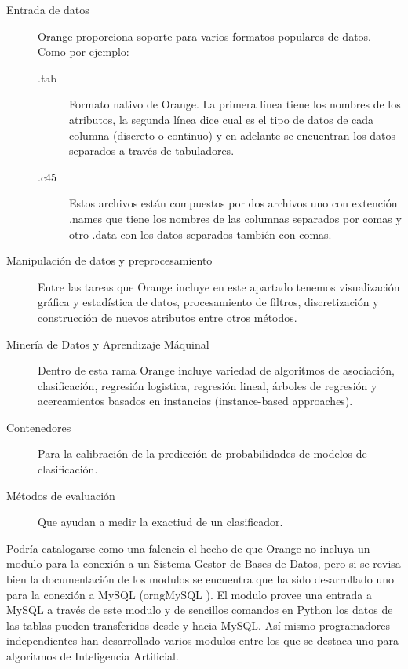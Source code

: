 \begin{description}
\item [Entrada de datos] Orange proporciona soporte para varios formatos popu\-lares de datos. Como por ejemplo:
	\begin{description}
	\item  [.tab] Formato nativo de Orange. La primera l\'inea tiene los nombres de los atributos, la segunda
	l\'inea dice cual es el tipo de datos de cada columna (discreto o continuo) y en adelante se encuentran
	los datos separados a trav\'es de tabuladores.
	\item [.c45] Estos archivos est\'an compuestos por dos archivos uno con extenci\'on .names que tiene los
	nombres de las columnas separados por comas y otro .data con los datos separados tambi\'en con comas.
	\end{description}
	
\item [Manipulaci\'on de datos y preprocesamiento] Entre las tareas que Oran\-ge incluye en este apartado tenemos
visualizaci\'on gr\'afica y estad\'istica de datos, procesamiento de filtros, discretizaci\'on y construcci\'on
de nuevos atributos entre otros m\'etodos.

\item [Miner\'ia de Datos y Aprendizaje M\'aquinal] Dentro de esta rama Oran\-ge incluye variedad de algoritmos
de asociaci\'on, clasificaci\'on, regresi\'on logistica, regresi\'on lineal, \'arboles de regresi\'on y
acercamientos basados en instancias (instance-based approaches).

\item [Contenedores] Para la calibraci\'on de la predicci\'on de probabilidades de modelos de clasificaci\'on.

\item [M\'etodos de evaluaci\'on] Que ayudan a medir la exactiud de un clasificador.
\end{description}

Podr\'ia catalogarse como una falencia el hecho de que Orange no incluya un modulo para la conexi\'on a un Sistema
Gestor de Bases de Datos, pero si se revisa bien la documentaci\'on de los modulos se encuentra que ha sido
desarrollado uno para la conexi\'on a MySQL (orngMySQL \cite{oransql}). El modulo provee una entrada a MySQL a
trav\'es de este modulo y de sencillos comandos en Python los datos de las tablas pueden transferidos desde y
hacia MySQL. As\'i mismo programadores independientes han desarrollado varios modulos entre los que se destaca
uno para algoritmos de Inteligencia Artificial.\\

